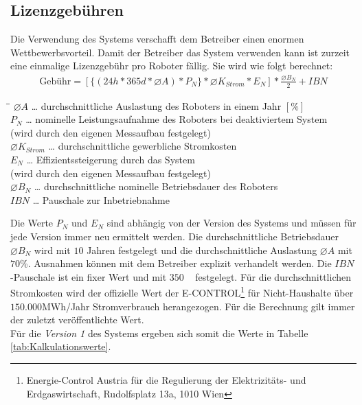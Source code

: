 \subsection{Lizenzgebühren}
Die Verwendung des Systems verschafft dem Betreiber einen enormen Wettbewerbsvorteil. Damit der Betreiber das System verwenden kann ist zurzeit eine einmalige Lizenzgebühr pro Roboter fällig. Sie wird wie folgt berechnet:\\
\begin{align*}
	\text{Gebühr} = [\{(24h * 365d * \varnothing A)*P_N\}*\varnothing K_{Strom}*E_N]*\frac{\varnothing B_N}{2} + IBN
\end{align*}
\begin{tabbing}
	\hspace{1,8cm}\=\hspace{0,6cm}\=\kill
	$\varnothing A$ \> \dots \> durchschnittliche Auslastung des Roboters in einem Jahr $[\%]$\\ 
	$P_N$\> \dots \> nominelle Leistungsaufnahme des Roboters bei deaktiviertem System\\ 
	\> \> (wird durch den eigenen Messaufbau festgelegt)\\
	$\varnothing K_{Strom}$\> \dots \> durchschnittliche gewerbliche Stromkosten\\ 
	$E_N$\> \dots \> Effizientssteigerung durch das System\\ 
	\> \> (wird durch den eigenen Messaufbau festgelegt) \\
	$\varnothing B_N$ \> \dots \> durchschnittliche nominelle Betriebsdauer des Roboters \\
	$IBN$ \> \dots \> Pauschale zur Inbetriebnahme
\end{tabbing}
Die Werte $P_N$ und $E_N$ sind abhängig von der Version des Systems und müssen für jede Version immer neu ermittelt werden. Die durchschnittliche Betriebsdauer $\varnothing B_N$ wird mit $10$ Jahren festgelegt und die durchschnittliche Auslastung $\varnothing A$ mit $70$\%. Ausnahmen können mit dem Betreiber explizit verhandelt werden. Die $IBN$-Pauschale ist ein fixer Wert und mit $350$ \officialeuro~ festgelegt. Für die durchschnittlichen Stromkosten wird der offizielle Wert der \textsf{E-CONTROL}\footnote{Energie-Control Austria für die Regulierung der Elektrizitäts- und Erdgaswirtschaft, Rudolfsplatz 13a, 1010 Wien} für Nicht-Haushalte über $150.000$MWh/Jahr Stromverbrauch herangezogen. Für die Berechnung gilt immer der zuletzt veröffentlichte Wert.\\
Für die \textit{Version 1} des Systems ergeben sich somit die Werte in Tabelle \ref{tab:Kalkulationswerte}.
